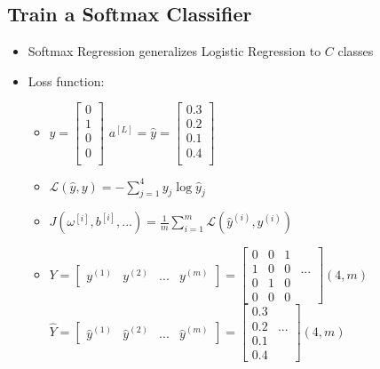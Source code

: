 \documentclass[12pt,a4paper]{report}
\begin{document}
			\subsection{Train a Softmax Classifier}
				\begin{itemize}
					\item Softmax Regression generalizes Logistic Regression to 
					$ C $ classes
					\item Loss function:
						\begin{itemize}
							\item $ y = 
								\begin{bmatrix}
									0\\ 1\\ 0\\ 0\\
								\end{bmatrix} $ \qquad
								$ a^{[L]} = \hat{y} = \begin{bmatrix}
									0.3\\ 0.2\\ 0.1\\ 0.4\\
								\end{bmatrix} $
							\item $ \mathcal{L}(\hat{y}, y) = - \displaystyle\sum_{j=1}^{4} y_j \log \hat{y}_j $
							\item $ J(\omega^{[i]}, b^{[i]},...) = \frac{1}{m} \displaystyle\sum_{i=1}^{m} \mathcal{L} (\hat{y}^{(i)}, y^{(i)}) $
							\item $ Y = 
							\begin{bmatrix}
								y^{(1)} & y^{(2)} & ... & y^{(m)}
							\end{bmatrix} = 
							\begin{bmatrix}
								0 & 0 & 1 \\
								1 & 0 & 0 & ...\\
								0 & 1 & 0 \\
								0 & 0 & 0
							\end{bmatrix} (4, m)$ \\
							$ \hat{Y} = 
							\begin{bmatrix}
								\hat{y}^{(1)} & \hat{y}^{(2)} & ... & \hat{y}^{(m)}
							\end{bmatrix} = 
							\begin{bmatrix}
								0.3  \\
								0.2 & ...\\
								0.1 \\
								0.4 
							\end{bmatrix} (4, m)$
						\end{itemize}
				\end{itemize}
\end{document}
